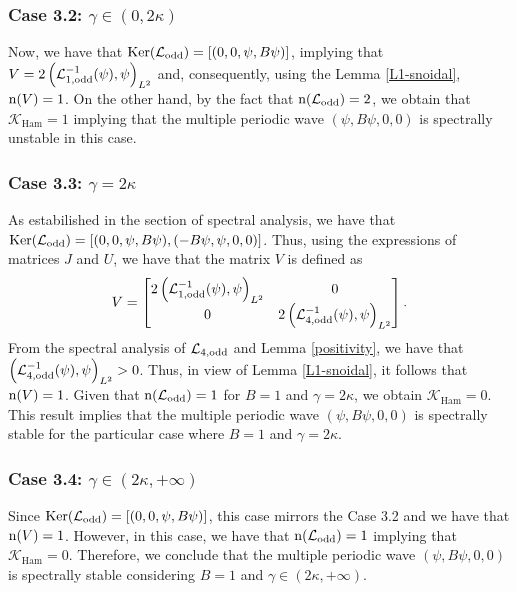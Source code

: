 \documentclass[10pt,reqno,a4paper]{amsart} %
\theoremstyle{definition} %
\numberwithin{equation}{section}
\numberwithin{figure}{section}
\begin{document}
\subsubsection*{Case 3.2: $\gamma \in (0,2\kappa)$} Now, we have that ${\rm Ker}(\mathcal{L}_{\rm odd}) = [(0,0,\psi, B\psi)]$, implying that $V = 2 \left( \mathcal{L}_{\rm 1,odd}^{-1} (\psi), \psi \right)_{L^2}$ and, consequently, using the Lemma \ref{L1-snoidal}, ${\rm n}(V) = 1$. On the other hand, by the fact that ${\rm n}(\mathcal{L}_{\rm odd}) = 2$, we obtain that $\mathcal{K}_{\text{Ham}} = 1$ implying that the multiple periodic wave $(\psi, B\psi, 0, 0)$ is spectrally unstable in this case.

\subsubsection*{Case 3.3: $\gamma = 2\kappa$} As estabilished in the section of spectral analysis, we have that ${\rm Ker}(\mathcal{L}_{\rm odd}) = [(0,0,\psi,B\psi), (-B\psi,\psi,0,0)]$. Thus, using the expressions of matrices $J$ and $U$, we have that the matrix $V$ is defined as
\begin{equation*}
    V = \begin{bmatrix}
        2 \left( \mathcal{L}_{\rm 1,odd}^{-1} (\psi), \psi \right)_{L^2} & 0 \\
        0 & 2 \left( \mathcal{L}_{\rm 4,odd}^{-1} (\psi), \psi \right)_{L^2}
    \end{bmatrix}.
\end{equation*}
From the spectral analysis of $\mathcal{L}_{\rm 4,odd}$ and Lemma \ref{positivity}, we have that $\left( \mathcal{L}_{\rm 4,odd}^{-1} (\psi), \psi \right)_{L^2} > 0$. Thus, in view of Lemma \ref{L1-snoidal}, it follows that ${\rm n}(V) = 1$. Given that ${\rm n}(\mathcal{L}_{\rm odd}) = 1$ for $B=1$ and $\gamma = 2\kappa$, we obtain $\mathcal{K}_{\text{Ham}} = 0$. This result implies that the multiple periodic wave $(\psi, B\psi, 0, 0)$ is spectrally stable for the particular case where $B = 1$ and $\gamma = 2\kappa$.

\subsubsection*{Case 3.4: $\gamma \in (2\kappa, +\infty)$} Since ${\rm Ker}(\mathcal{L}_{\text{odd}}) = [(0,0, \psi, B\psi)]$, this case mirrors the Case 3.2 and we have that ${\rm n}(V) = 1$. However, in this case, we have that ${\rm n}(\mathcal{L}_{\rm odd}) = 1$ implying that $\mathcal{K}_{\text{Ham}} = 0$. Therefore, we conclude that the multiple periodic wave $(\psi, B\psi, 0, 0)$ is spectrally stable considering $B = 1$ and $\gamma \in (2\kappa, +\infty)$.
\end{document}
